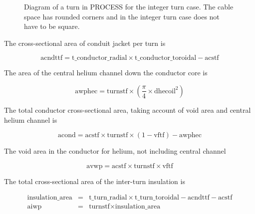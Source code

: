 \documentclass[hidelinks]{article}
\numberwithin{equation}{section}
\begin{document}
\begin{figure}[t!]
\begin{center}
      \end{center}
     \caption{Diagram of a turn in PROCESS for the integer turn case. The cable 
     space has rounded corners and in the integer turn case does not have to be 
     square.} \label{fig: turn-int}
    \end{figure}

    \noi The cross-sectional area of conduit jacket per turn is

    \begin{equation}
        \text{acndttf} = \text{t\_conductor\_radial} \times 
        \text{t\_conductor\_toroidal} - \text{acstf}
    \end{equation}

    \noi The area of the central helium channel down the conductor core is

    \begin{equation}
        \text{awphec} = \text{turnstf} \times (\frac{\pi}{4} \times \text{dhecoil}^2)
    \end{equation}

    \noi The total conductor cross-sectional area, taking account of void area and 
    central helium channel is
    
    \begin{equation}
        \text{acond} = \text{acstf} \times \text{turnstf} \times (1-\text{vftf}) - 
        \text{awphec}
    \end{equation}

    \noi The void area in the conductor for helium, not including central channel

    \begin{equation}
        \text{avwp} = \text{acstf} \times \text{turnstf} \times \text{vftf}
    \end{equation}

    \noi The total cross-sectional area of the inter-turn insulation is 

    \begin{eqnarray}
        \text{insulation\_area} &=& \text{t\_turn\_radial} \times \text{t\_turn\_toroidal} 
        - \text{acndttf} - \text{acstf}\\
        \text{aiwp} &=& \text{turnstf} \times \text{insulation\_area}
    \end{eqnarray}
\end{document}

